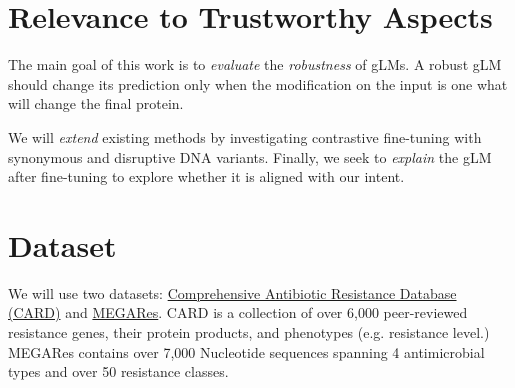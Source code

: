 \documentclass{article}
\newcommand{\todo}[1]{\textcolor{red}{[TODO: #1]}}
\begin{document}
\section{Relevance to Trustworthy Aspects}
\label{sec:trustworthy}

The main goal of this work is to \textit{evaluate} the \textit{robustness} of gLMs. A robust gLM should change its prediction only when the modification on the input is one what will change the final protein. 

We will \textit{extend} existing methods by investigating contrastive fine-tuning with synonymous and disruptive DNA variants. Finally, we seek to \textit{explain} the gLM after fine-tuning to explore whether it is aligned with our intent.




\section{Dataset}
\label{sec:dataset}


We will use two datasets: \href{https://card.mcmaster.ca}{Comprehensive Antibiotic Resistance Database (CARD)} and \href{https://github.com/Microbial-Ecology-Group/AMRplusplus}{MEGARes}. CARD is a collection of over 6,000 peer-reviewed resistance genes, their protein products, and phenotypes (e.g. resistance level.) MEGARes contains over 7,000 Nucleotide sequences spanning 4 antimicrobial types and over 50 resistance classes.
\end{document}
